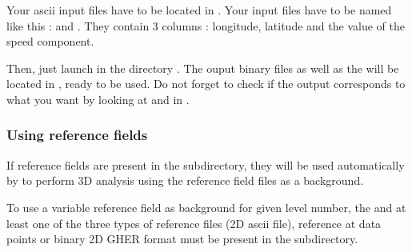 Your ascii input files have to be located in . Your input files have to be named like this : 
 and . They contain 3 columns : longitude,
latitude and the value of the speed component.

Then, just launch  in the directory . The ouput binary files as well as
the  will be located in , ready to be used. Do not forget to check if the output 
corresponds to what you want by looking at  and  in 
.

\begin{center}
\end{center}


\subsubsection{Using reference fields\label{divarefeuse}}


If reference fields are present in the  subdirectory, they will be used automatically by \diva to perform 3D analysis using the reference field files as a background.

To use a variable reference field as background for given level number, the  and at least one of the three types of reference files  (2D ascii file), reference at data points or  binary 2D GHER format must be present in the  subdirectory.

\begin{center}
\end{center}



